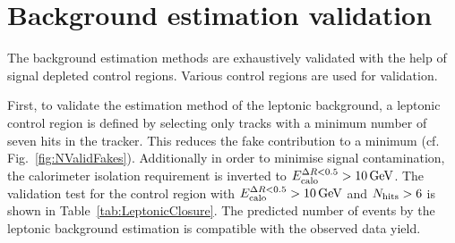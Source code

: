 \section{Background estimation validation}
\label{sec:BkgValidation}

The background estimation methods are exhaustively validated with the help of signal depleted control regions.
Various control regions are used for validation.

First, to validate the estimation method of the leptonic background, a leptonic control region is defined by selecting only tracks with a minimum number of seven hits in the tracker.
This reduces the fake contribution to a minimum (cf. Fig.~\ref{fig:NValidFakes}).
Additionally in order to minimise signal contamination, the calorimeter isolation requirement is inverted to $E^{\Delta R<0.5}_{\text{calo}}>10\,\text{Ge}\kern-0.06667em\text{V}$.
The validation test for the control region with $E^{\Delta R<0.5}_{\text{calo}}>10\,\text{Ge}\kern-0.06667em\text{V}$ and $N_{\text{hits}}>6$ is shown in Table~\ref{tab:LeptonicClosure}.
The predicted number of events by the leptonic background estimation is compatible with the observed data yield.\\
\renewcommand{\arraystretch}{1.5}
